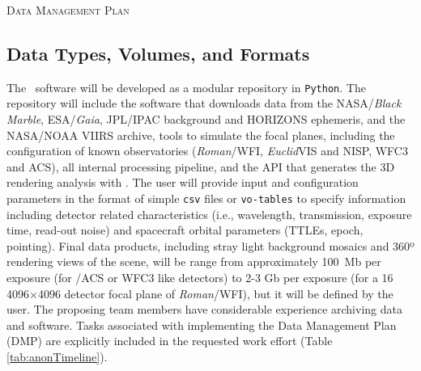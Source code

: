 \documentclass[usenames,dvipsnames,modern]{CLASS_FILES/aastex631}  %
\newcommand{\Euclid}{\emph{Euclid}}
\newcommand{\nosection}[1]{%
  \refstepcounter{section}%
  \markright{#1}}
\begin{document}
\newpage


\begin{center}\color{NavyBlue}\normalfont\Large\textsc{Data Management Plan}\end{center}
\nosection{dmp}
\vspace{-0.5cm}
\label{Sec:dataManagementPlan}
\subsection{Data Types, Volumes, and Formats}
\label{subsec:dataTypesVolumesFormats}
The \MyName\ software will be developed as a modular repository in \texttt{Python}. The repository will include the software that downloads data from the NASA/\emph{Black Marble}, ESA/\emph{Gaia}, JPL/IPAC background and HORIZONS ephemeris, and the NASA/NOAA VIIRS archive, tools to simulate the focal planes, including the configuration of known observatories (\emph{Roman}/WFI, \Euclid VIS and NISP, \HST WFC3 and ACS), all internal processing pipeline, and the API that generates the 3D rendering analysis with \Blender. The user will provide input and configuration parameters in the format of simple \texttt{csv} files or \texttt{vo-tables} to specify information including detector related characteristics (i.e., wavelength, transmission, exposure time, read-out noise) and spacecraft orbital parameters (TTLEs, epoch, pointing). Final data products, including stray light background mosaics and 360º rendering views of the scene, will be range from approximately 100~Mb per exposure (for \HST/ACS or WFC3 like detectors) to 2-3 Gb per exposure (for a 16 4096$\times$4096 detector focal plane of \emph{Roman}/WFI), but it will be defined by the user. The proposing team members have considerable experience archiving data and software. Tasks associated with implementing the Data Management Plan (DMP) are explicitly included in the requested work effort (Table \ref{tab:anonTimeline}).\\ 
\end{document}
